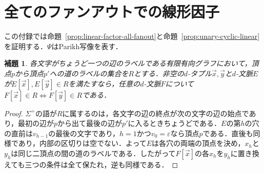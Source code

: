 \documentclass[11pt,a4paper]{ltjsarticle}
\numberwithin{equation}{section}
\theoremstyle{plain}
\newtheorem{lemma}[theorem]{補題}
\theoremstyle{definition}
\theoremstyle{remark}
\newcommand{\tuple}[1]{\vec{#1}}
\newcommand{\eps}{\varepsilon}
\begin{document}
\section{全てのファンアウトでの線形因子}
\label{app:linear-factor-fanout}

この付録では命題~\ref{prop:linear-factor-all-fanout}と命題~\ref{prop:unary-cyclic-linear}を証明する．$\Psi$はParikh写像を表す．

\begin{lemma}\label{lem:app-lf-path}
各文字がちょうど一つの辺のラベルである有限有向グラフにおいて，頂点$p$から頂点$p'$への道のラベルの集合を$R$とする．非空の$d$-タプル$\tuple x,\tuple y$と$d$-文脈$E$が$E[\tuple x],E[\tuple y]\in R$を満たすなら，任意の$d$-文脈$F$について$F[\tuple x]\in R\iff F[\tuple y]\in R$である．
\end{lemma}

\begin{proof}
$\Sigma^+$の語が$R$に属するのは，各文字の辺の終点が次の文字の辺の始点であり，最初の辺が$p$から出て最後の辺が$p'$に入るときちょうどである．$E$の第$h$の穴の直前は$v_{h-1}$の最後の文字であり，$h=1$かつ$v_0=\eps$なら頂点$p$である．直後も同様であり，内部の区切りは空でない．よって$E$は各穴の両端の頂点を決め，$x_h$と$y_h$は同じ二頂点の間の道のラベルである．したがって$F[\tuple x]$の各$x_h$を$y_h$に置き換えても三つの条件は全て保たれ，逆も同様である．
\end{proof}
\end{document}
